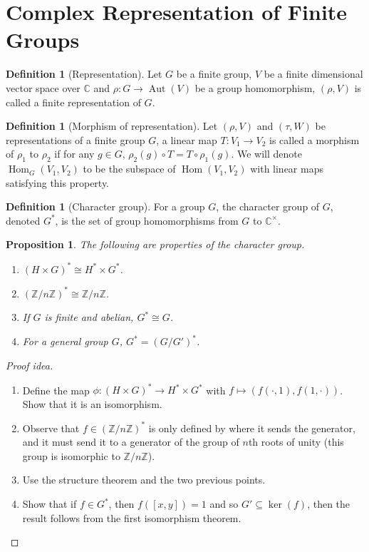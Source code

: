 \documentclass[paper=a4, fontsize=12pt]{scrartcl} %
\newtheorem{prop}[thm]{Proposition}
\theoremstyle{definition}
\newtheorem{defn}[thm]{Definition}
\theoremstyle{remark}
\newcommand{\Z}{\mathbb{Z}}
\DeclareMathOperator{\aut}{Aut}
\DeclareMathOperator{\homm}{Hom}
\numberwithin{equation}{section} %
\numberwithin{figure}{section} %
\numberwithin{table}{section} %
\begin{document}
\section{Complex Representation of Finite Groups}
\begin{defn}[Representation]
	Let $G$ be a finite group, $V$ be a finite dimensional vector space over $\mathbb{C}$ and $\rho: G \rightarrow \aut(V)$ be a group homomorphism, $(\rho, V)$ is called a finite representation of $G$.
\end{defn}
\begin{defn}[Morphism of representation]
	Let $(\rho, V)$ and $(\tau, W)$ be representations of a finite group $G$, a linear map $T: V_1 \rightarrow V_2$ is called a morphism of $\rho_1$ to $\rho_2$ if for any $g \in G$, $\rho_2(g) \circ T = T \circ \rho_1(g)$. We will denote $\homm_G(V_1, V_2)$ to be the subspace of $\homm(V_1, V_2)$ with linear maps satisfying this property.
\end{defn}
\begin{defn}[Character group]
	For a group $G$, the character group of $G$, denoted $G^*$, is the set of group homomorphisms from $G$ to $\mathbb{C}^{\times}$.
\end{defn}
\begin{prop}
	The following are properties of the character group.
	\begin{enumerate}
		\item $(H \times G)^{*} \cong H^* \times G^*$.
		\item $(\Z/n\Z)^* \cong \Z/n\Z$.
		\item If $G$ is finite and abelian, $G^* \cong G$.
		\item For a general group $G$, $G^* = (G/G')^*$.
	\end{enumerate}
\end{prop}
\begin{proof}[Proof idea]
	\begin{enumerate}
		\item Define the map $\phi : (H \times G)^* \rightarrow H^* \times G^*$ with $f \mapsto (f(\cdot, 1), f(1, \cdot))$. Show that it is an isomorphism.
		\item Observe that $f \in (\Z/n\Z)^*$ is only defined by where it sends the generator, and it must send it to a generator of the group of $n$th roots of unity (this group is isomorphic to $\Z/n\Z$).
		\item Use the structure theorem and the two previous points.
		\item Show that if $f \in G^*$, then $f([x,y]) = 1$ and so $G' \subseteq \ker(f)$, then the result follows from the first isomorphism theorem.
	\end{enumerate}
\end{proof}
\end{document}
